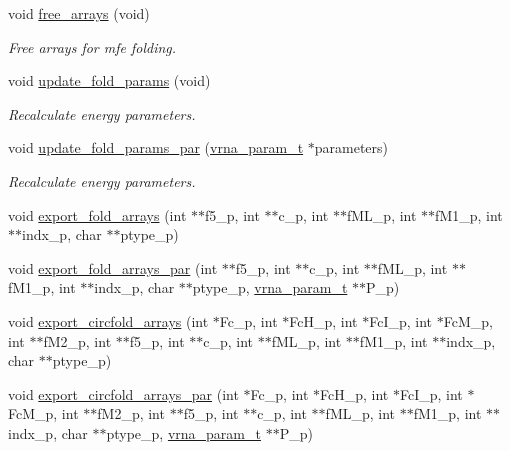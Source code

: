 \begin{DoxyCompactItemize}
void \mbox{\hyperlink{group__mfe__fold__single_ga107fdfe5fd641868156bfd849f6866c7}{free\+\_\+arrays}} (void)
\begin{DoxyCompactList}\small\item\em Free arrays for mfe folding. \end{DoxyCompactList}\item 
void \mbox{\hyperlink{group__mfe__fold__single_ga41bf8f6fa15b94471f7095cad9f0ccf3}{update\+\_\+fold\+\_\+params}} (void)
\begin{DoxyCompactList}\small\item\em Recalculate energy parameters. \end{DoxyCompactList}\item 
void \mbox{\hyperlink{group__mfe__fold__single_gae66dc422efb8f5d56717d92d6002a9f8}{update\+\_\+fold\+\_\+params\+\_\+par}} (\mbox{\hyperlink{group__energy__parameters_ga8a69ca7d787e4fd6079914f5343a1f35}{vrna\+\_\+param\+\_\+t}} $\ast$parameters)
\begin{DoxyCompactList}\small\item\em Recalculate energy parameters. \end{DoxyCompactList}\item 
void \mbox{\hyperlink{group__mfe__fold__single_ga99641b8dbb40891da5490d3cc271e607}{export\+\_\+fold\+\_\+arrays}} (int $\ast$$\ast$f5\+\_\+p, int $\ast$$\ast$c\+\_\+p, int $\ast$$\ast$f\+M\+L\+\_\+p, int $\ast$$\ast$f\+M1\+\_\+p, int $\ast$$\ast$indx\+\_\+p, char $\ast$$\ast$ptype\+\_\+p)
\item 
void \mbox{\hyperlink{group__mfe__fold__single_ga6606ec0ec964ea506fdadb997a1a5328}{export\+\_\+fold\+\_\+arrays\+\_\+par}} (int $\ast$$\ast$f5\+\_\+p, int $\ast$$\ast$c\+\_\+p, int $\ast$$\ast$f\+M\+L\+\_\+p, int $\ast$$\ast$f\+M1\+\_\+p, int $\ast$$\ast$indx\+\_\+p, char $\ast$$\ast$ptype\+\_\+p, \mbox{\hyperlink{group__energy__parameters_ga8a69ca7d787e4fd6079914f5343a1f35}{vrna\+\_\+param\+\_\+t}} $\ast$$\ast$P\+\_\+p)
\item 
void \mbox{\hyperlink{group__mfe__fold__single_ga04d5d639fd4473ca766436a9bae5665c}{export\+\_\+circfold\+\_\+arrays}} (int $\ast$Fc\+\_\+p, int $\ast$Fc\+H\+\_\+p, int $\ast$Fc\+I\+\_\+p, int $\ast$Fc\+M\+\_\+p, int $\ast$$\ast$f\+M2\+\_\+p, int $\ast$$\ast$f5\+\_\+p, int $\ast$$\ast$c\+\_\+p, int $\ast$$\ast$f\+M\+L\+\_\+p, int $\ast$$\ast$f\+M1\+\_\+p, int $\ast$$\ast$indx\+\_\+p, char $\ast$$\ast$ptype\+\_\+p)
\item 
void \mbox{\hyperlink{group__mfe__fold__single_ga004bb901e7fd2f8d5ae68f9530318ce1}{export\+\_\+circfold\+\_\+arrays\+\_\+par}} (int $\ast$Fc\+\_\+p, int $\ast$Fc\+H\+\_\+p, int $\ast$Fc\+I\+\_\+p, int $\ast$Fc\+M\+\_\+p, int $\ast$$\ast$f\+M2\+\_\+p, int $\ast$$\ast$f5\+\_\+p, int $\ast$$\ast$c\+\_\+p, int $\ast$$\ast$f\+M\+L\+\_\+p, int $\ast$$\ast$f\+M1\+\_\+p, int $\ast$$\ast$indx\+\_\+p, char $\ast$$\ast$ptype\+\_\+p, \mbox{\hyperlink{group__energy__parameters_ga8a69ca7d787e4fd6079914f5343a1f35}{vrna\+\_\+param\+\_\+t}} $\ast$$\ast$P\+\_\+p)

\end{DoxyCompactItemize}
